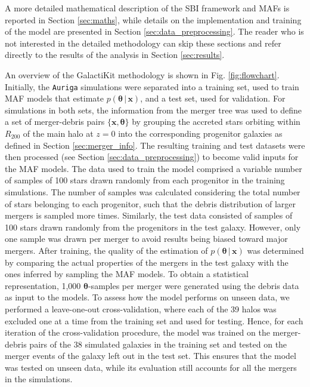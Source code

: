 A more detailed mathematical description of the SBI framework and MAFs is reported in Section \ref{sec:maths}, while details on the implementation and training of the model are presented in Section \ref{sec:data_preprocessing}. The reader who is not interested in the detailed methodology can skip these sections and refer directly to the results of the analysis in Section \ref{sec:results}.

An overview of the GalactiKit methodology is shown in Fig. \ref{fig:flowchart}. Initially, the \texttt{Auriga} simulations were separated into a training set, used to train MAF models that estimate $p(\bm{\theta} \, | \, \bm{x})$, and a test set, used for validation. For simulations in both sets, the information from the merger tree was used to define a set of merger-debris pairs $\{\bm{x},\bm{\theta}\}$ by grouping the accreted stars orbiting within $R_{200}$ of the main halo at $z=0$ into the corresponding progenitor galaxies as defined in Section \ref{sec:merger_info}. The resulting training and test datasets were then processed (see Section \ref{sec:data_preprocessing}) to become valid inputs for the MAF models. The data used to train the model comprised a variable number of samples of 100 stars drawn randomly from each progenitor in the training simulations. The number of samples was calculated considering the total number of stars belonging to each progenitor, such that the debris distribution of larger mergers is sampled more times. Similarly, the test data consisted of samples of 100 stars drawn randomly from the progenitors in the test galaxy. However, only one sample was drawn per merger to avoid results being biased toward major mergers. After training, the quality of the estimation of $p(\bm{\theta} \, | \, \bm{x})$ was determined by comparing the actual properties of the mergers in the test galaxy with the ones inferred by sampling the MAF models. To obtain a statistical representation, 1,000 $\bm{\theta}$-samples per merger were generated using the debris data as input to the models. 
To assess how the model performs on unseen data, we performed a leave-one-out cross-validation, where each of the 39 halos was excluded one at a time from the training set and used for testing. Hence, for each iteration of the cross-validation procedure, the model was trained on the merger-debris pairs of the 38 simulated galaxies in the training set and tested on the merger events of the galaxy left out in the test set. This ensures that the model was tested on unseen data, while its evaluation still accounts for all the mergers in the simulations.

